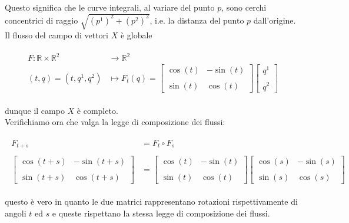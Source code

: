 Questo significa che le curve integrali, al variare del punto $ p $, sono cerchi concentrici di raggio $ \sqrt{(p^{1})^{2} + (p^{2})^{2}} $, i.e. la distanza del punto $ p $ dall'origine.\\
Il flusso del campo di vettori $ X $ è globale

\begin{align}
	\begin{split}
		F : \mathbb{R} \times \mathbb{R}^{2} &\to \mathbb{R}^{2}\\
		(t,q) = (t,q^{1},q^{2}) &\mapsto F_{t}(q) = %
		\begin{bmatrix}
			\cos(t) & - \sin(t) \\\\%
			\sin(t) & \cos(t)
		\end{bmatrix}%
		\begin{bmatrix}
			q^{1} \\\\ q^{2}
		\end{bmatrix}
	\end{split}
\end{align}

dunque il campo $ X $ è completo.\\
Verifichiamo ora che valga la legge di composizione dei flussi:

\begin{align}
	\begin{split}
		F_{t+s} &= F_{t} \circ F_{s}\\\\
		\begin{bmatrix}
			\cos(t+s) & - \sin(t+s) \\\\%
			\sin(t+s) & \cos(t+s)
		\end{bmatrix}%
		&= %
		\begin{bmatrix}
			\cos(t) & - \sin(t) \\\\%
			\sin(t) & \cos(t)
		\end{bmatrix}%
		\begin{bmatrix}
			\cos(s) & - \sin(s) \\\\%
			\sin(s) & \cos(s)
		\end{bmatrix}
	\end{split}
\end{align}

questo è vero in quanto le due matrici rappresentano rotazioni rispettivamente di angoli $ t $ ed $ s $ e queste rispettano la stessa legge di composizione dei flussi.

